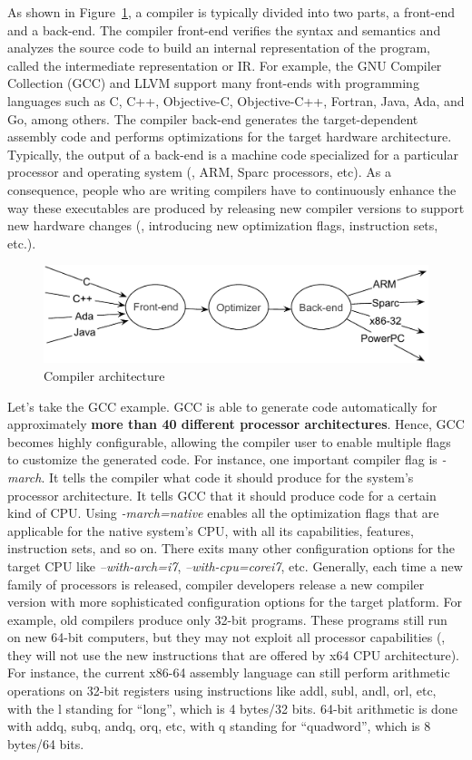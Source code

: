 As shown in Figure~\ref{fig:compilers}, a compiler is typically divided into two parts, a front-end and a back-end. The compiler front-end verifies the syntax and semantics and analyzes the source code to build an internal representation of the program, called the intermediate representation or IR. For example, the GNU Compiler Collection (GCC) and LLVM support many front-ends with programming languages such as C, C++, Objective-C, Objective-C++, Fortran, Java, Ada, and Go, among others. The compiler back-end generates the target-dependent assembly code and performs optimizations for the target hardware architecture. Typically, the output of a back-end is a machine code specialized for a particular processor and operating system (\eg, ARM, Sparc processors, etc).
As a consequence, people who are writing compilers have to continuously enhance the way these executables are produced by releasing new compiler versions to support new hardware changes (\ie, introducing new optimization flags, instruction sets, etc.). 
\begin{figure}[h]
	\center
	\includegraphics[scale=0.65]{Background/fig/compilers}
	\caption{Compiler architecture}
	\label{fig:compilers}
\end{figure}

Let's take the GCC example. GCC is able to generate code automatically for approximately \textbf{more than 40 different processor architectures}. Hence, GCC becomes highly configurable, allowing the compiler user to enable multiple flags to customize the generated code. For instance, one important compiler flag is \textit{-march}. It tells the compiler what code it should produce for the system's processor architecture. It tells GCC that it should produce code for a certain kind of CPU. Using \textit{-march=native} enables all the optimization flags that are applicable for the native system's CPU, with all its capabilities, features, instruction sets, and so on. There exits many other configuration options for the target CPU like \textit{--with-arch=i7}, \textit{--with-cpu=corei7}, etc.
Generally, each time a new family of processors is released, compiler developers release a new compiler version with more sophisticated configuration options for the target platform. For example, old compilers produce only 32-bit programs. These programs still run on new 64-bit computers, but they may not exploit all processor capabilities (\eg, they will not use the new instructions that are offered by x64 CPU architecture). For instance, the current x86-64 assembly language can still perform arithmetic operations on 32-bit registers using instructions like addl, subl, andl, orl, etc, with the l standing for ``long'', which is 4 bytes/32 bits. 64-bit arithmetic is done with addq, subq, andq, orq, etc, with q standing for ``quadword'', which is 8 bytes/64 bits.

